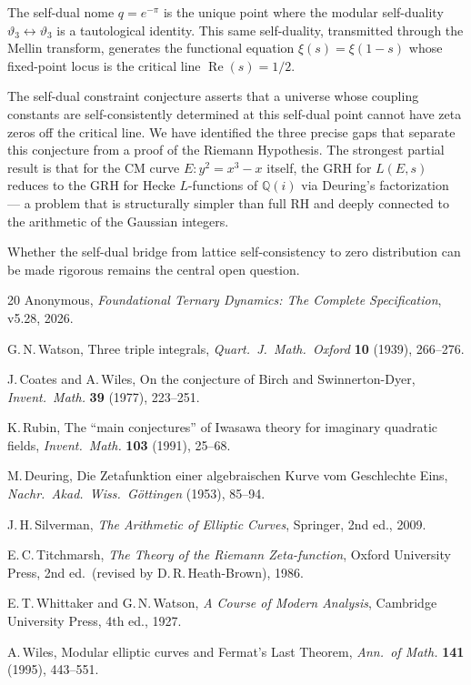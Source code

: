 \documentclass[11pt]{article}
\theoremstyle{tight}
\theoremstyle{plainroman}
\newcommand{\Q}{\mathbb{Q}}
\begin{document}
The self-dual nome $q=e^{-\pi}$ is the unique point where the modular self-duality $\vartheta_3\leftrightarrow\vartheta_3$ is a tautological identity.
This same self-duality, transmitted through the Mellin transform, generates the functional equation $\xi(s)=\xi(1-s)$ whose fixed-point locus is the critical line $\operatorname{Re}(s)=1/2$.

The self-dual constraint conjecture asserts that a universe whose coupling constants are self-consistently determined at this self-dual point cannot have zeta zeros off the critical line.
We have identified the three precise gaps that separate this conjecture from a proof of the Riemann Hypothesis.
The strongest partial result is that for the CM curve $E:y^2=x^3-x$ itself, the GRH for $L(E,s)$ reduces to the GRH for Hecke $L$-functions of $\Q(i)$ via Deuring's factorization --- a problem that is structurally simpler than full RH and deeply connected to the arithmetic of the Gaussian integers.

Whether the self-dual bridge from lattice self-consistency to zero distribution can be made rigorous remains the central open question.

\begin{thebibliography}{20}
Anonymous,
\emph{Foundational Ternary Dynamics: The Complete Specification}, v5.28, 2026.

G.\,N.\,Watson,
Three triple integrals,
\emph{Quart.\ J.\ Math.\ Oxford} \textbf{10} (1939), 266--276.

J.\,Coates and A.\,Wiles,
On the conjecture of Birch and Swinnerton-Dyer,
\emph{Invent.\ Math.} \textbf{39} (1977), 223--251.

K.\,Rubin,
The ``main conjectures'' of Iwasawa theory for imaginary quadratic fields,
\emph{Invent.\ Math.} \textbf{103} (1991), 25--68.

M.\,Deuring,
Die Zetafunktion einer algebraischen Kurve vom Geschlechte Eins,
\emph{Nachr.\ Akad.\ Wiss.\ G\"ottingen} (1953), 85--94.

J.\,H.\,Silverman,
\emph{The Arithmetic of Elliptic Curves},
Springer, 2nd ed., 2009.

E.\,C.\,Titchmarsh,
\emph{The Theory of the Riemann Zeta-function},
Oxford University Press, 2nd ed.\ (revised by D.\,R.\,Heath-Brown), 1986.

E.\,T.\,Whittaker and G.\,N.\,Watson,
\emph{A Course of Modern Analysis},
Cambridge University Press, 4th ed., 1927.

A.\,Wiles,
Modular elliptic curves and Fermat's Last Theorem,
\emph{Ann.\ of Math.} \textbf{141} (1995), 443--551.
\end{thebibliography}
\end{document}

